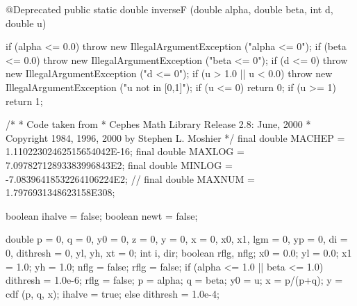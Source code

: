 \begin{code}\begin{hide}

   @Deprecated
   public static double inverseF (double alpha, double beta, int d, double u) {
      if (alpha <= 0.0)
         throw new IllegalArgumentException ("alpha <= 0");
      if (beta <= 0.0)
         throw new IllegalArgumentException ("beta <= 0");
      if (d <= 0)
        throw new IllegalArgumentException ("d <= 0");
      if (u > 1.0 || u < 0.0)
         throw new IllegalArgumentException ("u not in [0,1]");
      if (u <= 0)
         return 0;
      if (u >= 1)
         return 1;

      /*
       * Code taken from
       * Cephes Math Library Release 2.8:  June, 2000
       * Copyright 1984, 1996, 2000 by Stephen L. Moshier
       */
      final double MACHEP = 1.11022302462515654042E-16;
      final double MAXLOG = 7.09782712893383996843E2;
      final double MINLOG = -7.08396418532264106224E2;
    //  final double MAXNUM = 1.7976931348623158E308;

      boolean ihalve = false;
      boolean newt = false;

      double p = 0, q = 0, y0 = 0, z = 0, y = 0, x = 0, x0, x1, lgm = 0,
             yp = 0, di = 0, dithresh = 0, yl, yh, xt = 0;
      int i, dir;
      boolean rflg, nflg;
      x0 = 0.0;
      yl = 0.0;
      x1 = 1.0;
      yh = 1.0;
      nflg = false;
      rflg = false;
      if (alpha <= 1.0 || beta <= 1.0) {
         dithresh = 1.0e-6;
         rflg = false;
         p = alpha;
         q = beta;
         y0 = u;
         x = p/(p+q);
         y = cdf (p, q, x);
         ihalve = true;
      }
      else
         dithresh = 1.0e-4;

}
\end{hide}
\end{code}
